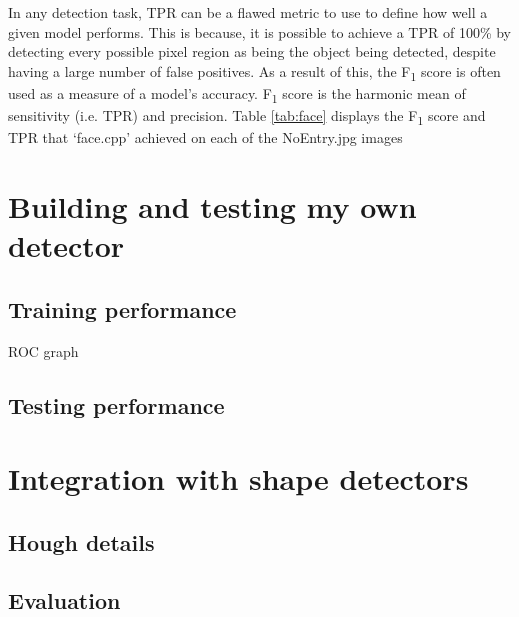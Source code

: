 \documentclass[onecolumn, 11pt, a4paper]{article}
\begin{document}
In any detection task, TPR can be a flawed metric to use to define how well a given model performs.
This is because, it is possible to achieve a TPR of 100\% by detecting every possible pixel region as being the object being detected, despite having a large number of false positives.
As a result of this, the F\textsubscript{1} score is often used as a measure of a model's accuracy.
F\textsubscript{1} score is the harmonic mean of sensitivity (i.e. TPR) and precision.
Table \ref{tab:face} displays the F\textsubscript{1} score and TPR that `face.cpp' achieved on each of the NoEntry\textasteriskcentered.jpg images

\clearpage

\section{Building and testing my own detector}

\subsection{Training performance}

ROC graph

\subsection{Testing performance}

\clearpage

\section{Integration with shape detectors}

\subsection{Hough details}

\subsection{Evaluation}
\end{document}
